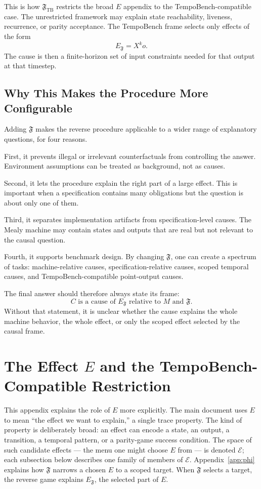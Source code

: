 \documentclass[11pt]{article}
\theoremstyle{remark}
\newcommand{\Effects}{\mathcal{E}}
\newcommand{\Frame}{\mathfrak{F}}
\begin{document}
This is how \(\Frame_{\mathrm{TB}}\) restricts the broad \(E\) appendix to the
TempoBench-compatible case. The unrestricted framework may explain state
reachability, liveness, recurrence, or parity acceptance. The TempoBench frame
selects only effects of the form
\[
  E_{\Frame} = X^k o.
\]
The cause is then a finite-horizon set of input constraints needed for that
output at that timestep.

\subsection{Why This Makes the Procedure More Configurable}

Adding \(\Frame\) makes the reverse procedure applicable to a wider range of
explanatory questions, for four reasons.

First, it prevents illegal or irrelevant counterfactuals from controlling the
answer. Environment assumptions can be treated as background, not as causes.

Second, it lets the procedure explain the right part of a large effect. This is
important when a specification contains many obligations but the question is
about only one of them.

Third, it separates implementation artifacts from specification-level causes.
The Mealy machine may contain states and outputs that are real but not relevant
to the causal question.

Fourth, it supports benchmark design. By changing \(\Frame\), one can create a
spectrum of tasks: machine-relative causes, specification-relative causes,
scoped temporal causes, and TempoBench-compatible point-output causes.

The final answer should therefore always state its frame:
\[
  C \text{ is a cause of } E_{\Frame}
  \text{ relative to } M \text{ and } \Frame.
\]
Without that statement, it is unclear whether the cause explains the whole
machine behavior, the whole effect, or only the scoped effect selected by the
causal frame.

\section{The Effect \texorpdfstring{\(E\)}{E} and the TempoBench-Compatible Restriction}
\label{app:effect}

This appendix explains the role of \(E\) more explicitly. The main document
uses \(E\) to mean ``the effect we want to explain,'' a single trace property.
The kind of property is deliberately broad: an effect can encode a state, an
output, a transition, a temporal pattern, or a parity-game success condition.
The space of such candidate effects --- the menu one might choose \(E\) from ---
is denoted \(\Effects\); each subsection below describes one family of members of
\(\Effects\). Appendix~\ref{app:phi} explains how \(\Frame\) narrows a chosen
\(E\) to a scoped target. When \(\Frame\) selects a target, the reverse game
explains \(E_{\Frame}\), the selected part of \(E\).
\end{document}
